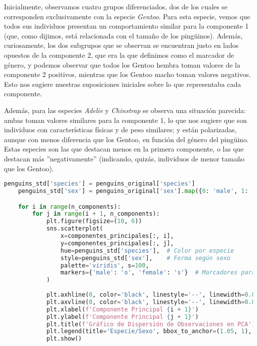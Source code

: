 \documentclass[a4paper,onecolumn]{extarticle}
\begin{document}
\begin{sloppypar}
Inicialmente, observamos cuatro grupos diferenciados, dos de los cuales se corresponden exclusivamente con la especie \textit{Gentoo}. Para esta especie, 
vemos que todos sus individuos presentan un comportamiento similar para la componente 1 (que, como dijimos, está relacionada con el tamaño de los pingüinos). 
Además, curiosamente, los dos subgrupos que se observan se encuentran justo en lados opuestos de la componente 2, que era la que definimos como el marcador 
de género, y podemos observar que todos los Gentoo hembra toman valores de la componente 2 positivos, mientras que los Gentoo macho toman valores negativos. 
Esto nos sugiere nuestras suposiciones iniciales sobre lo que representaba cada componente.

Además, para las especies \textit{Adelie} y \textit{Chinstrap} se observa una situación parecida: ambas toman valores similares para la componente 1, lo que 
nos sugiere que son individuos con características físicas y de peso similares; y están polarizadas, aunque con menos diferencia que los Gentoo, en función 
del género del pingüino. Estas especies son las que destacan menos en la primera componente, o las que destacan más ''negativamente'' (indicando, quizás, 
individuos de menor tamaño que los Gentoo).

\begin{lstlisting}[language=Python, label={lst:code}, caption={Código para la obtención del gráfico de dispersión}]
    penguins_std['species'] = penguins_original['species']
    penguins_std['sex'] = penguins_original['sex'].map({0: 'male', 1: 'female'})

    for i in range(n_components):
        for j in range(i + 1, n_components):
            plt.figure(figsize=(10, 6)) 
            sns.scatterplot(
                x=componentes_principales[:, i], 
                y=componentes_principales[:, j],  
                hue=penguins_std['species'],  # Color por especie
                style=penguins_std['sex'],    # Forma según sexo
                palette='viridis', s=100, 
                markers={'male': 'o', 'female': 's'}  # Marcadores para machos y hembras
            )
            
            plt.axhline(0, color='black', linestyle='--', linewidth=0.8)
            plt.axvline(0, color='black', linestyle='--', linewidth=0.8)
            plt.xlabel(f'Componente Principal {i + 1}')
            plt.ylabel(f'Componente Principal {j + 1}')
            plt.title(f'Gráfico de Dispersión de Observaciones en PCA')
            plt.legend(title='Especie/Sexo', bbox_to_anchor=(1.05, 1), loc='upper left')
            plt.show()
\end{lstlisting}


\end{sloppypar}
\end{document}
